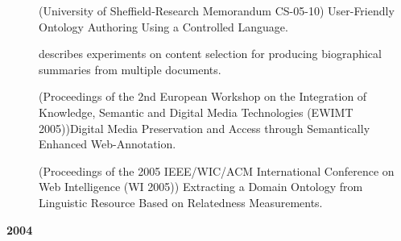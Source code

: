 \begin{description}
\item[\cite{Polajnar05}] (University of Sheffield-Research Memorandum CS-05-10) User-Friendly Ontology Authoring Using a Controlled Language.

\item[\cite{Saggion&Gaizauskas'05a}] describes experiments on content selection for producing biographical summaries from multiple documents.

\item[\cite{Ursu05}] (Proceedings of the 2nd European Workshop on the Integration of Knowledge, Semantic and Digital Media Technologies (EWIMT 2005))Digital Media Preservation and Access through Semantically Enhanced Web-Annotation.

\item[\cite{Wang05}] (Proceedings of the 2005 IEEE/WIC/ACM International Conference on Web Intelligence (WI 2005)) Extracting a Domain Ontology from Linguistic Resource Based on Relatedness Measurements.

\end{description}

\textbf{2004}

